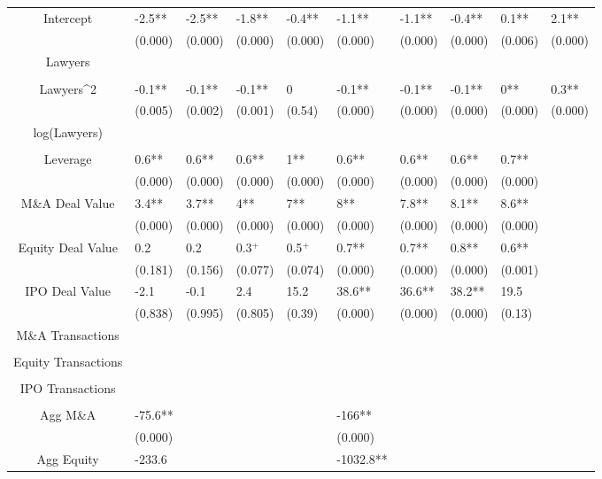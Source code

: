 \documentclass{article}
\begin{document}
\begin{table}[H]
\begin{tabular}{|clllllllll|}
Intercept & -2.5** & -2.5** & -1.8** & -0.4** & -1.1** & -1.1** & -0.4** & 0.1** & 2.1** \\ 
   & (0.000) & (0.000) & (0.000) & (0.000) & (0.000) & (0.000) & (0.000) & (0.006) & (0.000) \\ 
  Lawyers &  &  &  &  &  &  &  &  &  \\ 
   &  &  &  &  &  &  &  &  &  \\ 
  Lawyers^2 & -0.1** & -0.1** & -0.1** & 0 & -0.1** & -0.1** & -0.1** & 0** & 0.3** \\ 
   & (0.005) & (0.002) & (0.001) & (0.54) & (0.000) & (0.000) & (0.000) & (0.000) & (0.000) \\ 
  log(Lawyers) &  &  &  &  &  &  &  &  &  \\ 
   &  &  &  &  &  &  &  &  &  \\ 
  Leverage & 0.6** & 0.6** & 0.6** & 1** & 0.6** & 0.6** & 0.6** & 0.7** &  \\ 
   & (0.000) & (0.000) & (0.000) & (0.000) & (0.000) & (0.000) & (0.000) & (0.000) &  \\ 
  M\&A Deal Value & 3.4** & 3.7** & 4** & 7** & 8** & 7.8** & 8.1** & 8.6** &  \\ 
   & (0.000) & (0.000) & (0.000) & (0.000) & (0.000) & (0.000) & (0.000) & (0.000) &  \\ 
  Equity Deal Value & 0.2 & 0.2 & 0.3$^{+}$ & 0.5$^{+}$ & 0.7** & 0.7** & 0.8** & 0.6** &  \\ 
   & (0.181) & (0.156) & (0.077) & (0.074) & (0.000) & (0.000) & (0.000) & (0.001) &  \\ 
  IPO Deal Value & -2.1 & -0.1 & 2.4 & 15.2 & 38.6** & 36.6** & 38.2** & 19.5 &  \\ 
   & (0.838) & (0.995) & (0.805) & (0.39) & (0.000) & (0.000) & (0.000) & (0.13) &  \\ 
  M\&A Transactions &  &  &  &  &  &  &  &  &  \\ 
   &  &  &  &  &  &  &  &  &  \\ 
  Equity Transactions &  &  &  &  &  &  &  &  &  \\ 
   &  &  &  &  &  &  &  &  &  \\ 
  IPO Transactions &  &  &  &  &  &  &  &  &  \\ 
   &  &  &  &  &  &  &  &  &  \\ 
  Agg M\&A & -75.6** &  &  &  & -166** &  &  &  &  \\ 
   & (0.000) &  &  &  & (0.000) &  &  &  &  \\ 
  Agg Equity & -233.6 &  &  &  & -1032.8** &  &  &  &  \\ 

\end{tabular}
\end{table}
\end{document}
